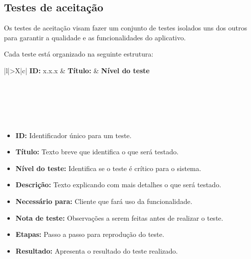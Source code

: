 \documentclass[
	12pt,				%
	oneside,			%
	a4paper,			%
	brazil				%
]{abntex2}
\begin{document}
{\begin{apendicesenv}
\chapter{Testes de aceitação}

Os testes de aceitação visam fazer um conjunto de testes isolados uns dos outros para garantir a qualidade e as funcionalidades do aplicativo.

Cada teste está organizado na seguinte estrutura:

\bgroup
\def\arraystretch{1.5}
\begin{table}[H]

\begin{tabularx}{\textwidth}{|l|>{\hsize}X|c|}
\hline 
\textbf{ID:} x.x.x & \textbf{Título:}  & \textbf{Nível do teste} \\ 
\hline 
{} \\ 
\hline  
{} \\ 
\hline 
{} \\ 
\hline 
{} \\ 
\hline 
{} \\ 
\hline 
\end{tabularx} 

\end{table}
\egroup

\begin{itemize}

\item \textbf{ID:} Identificador único para um teste.
\item \textbf{Título: }Texto breve que identifica o que será testado.
\item \textbf{Nível do teste:} Identifica se o teste é crítico para o sistema.
\item \textbf{Descrição:} Texto explicando com mais detalhes o que será testado.
\item \textbf{Necessário para:} Cliente que fará uso da funcionalidade.
\item \textbf{Nota de teste:} Observações a serem feitas antes de realizar o teste.
\item \textbf{Etapas:} Passo a passo para reprodução do teste.
\item \textbf{Resultado:} Apresenta o resultado do teste realizado.


\end{itemize}
\end{apendicesenv}}
\end{document}
